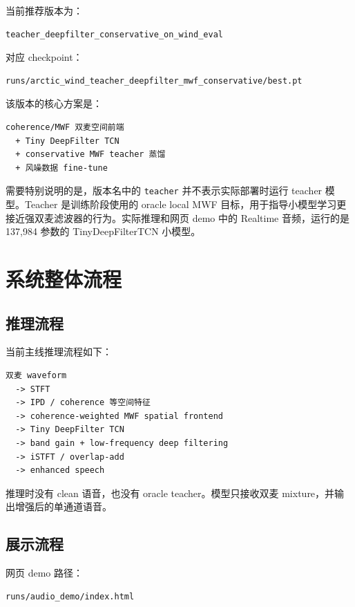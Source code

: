 \documentclass[UTF8,12pt,a4paper]{ctexart}
\begin{document}
当前推荐版本为：

\begin{lstlisting}
teacher_deepfilter_conservative_on_wind_eval
\end{lstlisting}

对应 checkpoint：

\begin{lstlisting}
runs/arctic_wind_teacher_deepfilter_mwf_conservative/best.pt
\end{lstlisting}

该版本的核心方案是：

\begin{lstlisting}
coherence/MWF 双麦空间前端
  + Tiny DeepFilter TCN
  + conservative MWF teacher 蒸馏
  + 风噪数据 fine-tune
\end{lstlisting}

需要特别说明的是，版本名中的 \texttt{teacher} 并不表示实际部署时运行 teacher 模型。Teacher 是训练阶段使用的 oracle local MWF 目标，用于指导小模型学习更接近强双麦滤波器的行为。实际推理和网页 demo 中的 Realtime 音频，运行的是 137,984 参数的 TinyDeepFilterTCN 小模型。

\section{系统整体流程}

\subsection{推理流程}

当前主线推理流程如下：

\begin{lstlisting}
双麦 waveform
  -> STFT
  -> IPD / coherence 等空间特征
  -> coherence-weighted MWF spatial frontend
  -> Tiny DeepFilter TCN
  -> band gain + low-frequency deep filtering
  -> iSTFT / overlap-add
  -> enhanced speech
\end{lstlisting}

推理时没有 clean 语音，也没有 oracle teacher。模型只接收双麦 mixture，并输出增强后的单通道语音。

\subsection{展示流程}

网页 demo 路径：

\begin{lstlisting}
runs/audio_demo/index.html
\end{lstlisting}
\end{document}
